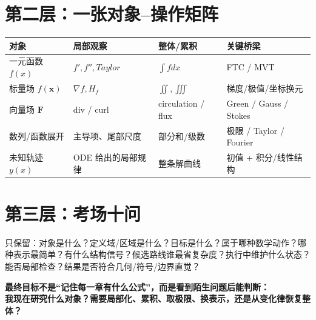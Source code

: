 \documentclass[11pt,a4paper,openany]{ctexbook}
\begin{document}
\section{第二层：一张对象--操作矩阵}
\begin{longtable}{L{3.1cm}L{3.8cm}L{4.0cm}L{\dimexpr\linewidth-11.07cm\relax}}
\toprule
\textbf{对象} & \textbf{局部观察} & \textbf{整体/累积} & \textbf{关键桥梁}\\
\midrule
一元函数 $f(x)$ & $f',f'',Taylor$ & $\int fdx$ & FTC / MVT\\
标量场 $f(\bm x)$ & $\nabla f,H_f$ & $\iint,\iiint$ & 梯度/极值/坐标换元\\
向量场 $\bm F$ & div / curl & circulation / flux & Green / Gauss / Stokes\\
数列/函数展开 & 主导项、尾部尺度 & 部分和/级数 & 极限 / Taylor / Fourier\\
未知轨迹 $y(x)$ & ODE 给出的局部规律 & 整条解曲线 & 初值 + 积分/线性结构\\
\bottomrule
\end{longtable}

\section{第三层：考场十问}
只保留：对象是什么？定义域/区域是什么？目标是什么？属于哪种数学动作？哪种表示最简单？有什么结构信号？候选路线谁最省复杂度？执行中维护什么状态？能否局部检查？结果是否符合几何/符号/边界直觉？

\begin{center}
\Large\bfseries\color{deep}
最终目标不是“记住每一章有什么公式”，而是看到陌生问题后能判断：\\[0.4em]
我现在研究什么对象？需要局部化、累积、取极限、换表示，还是从变化律恢复整体？
\end{center}
\end{document}

